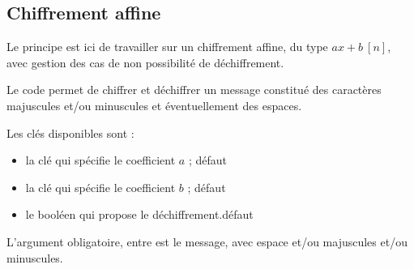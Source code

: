 \begin{PresCodePL}{}
\resinvmod
\end{PresCodePL}

\begin{PresCodePL}{}
\end{PresCodePL}

\subsection{Chiffrement affine}

\begin{tipblock}
Le principe est ici de travailler sur un chiffrement affine, du type $ax+b \: [n]$, avec gestion des cas de non possibilité de déchiffrement.

\smallskip

Le code permet de chiffrer et déchiffrer un message constitué des caractères majuscules et/ou minuscules et éventuellement des espaces.
\end{tipblock}

\begin{PresCodePL}{}
\end{PresCodePL}

\begin{cautionblock}
Les clés disponibles sont :

\begin{itemize}
	\item la clé  qui spécifie le coefficient $a$ ; \hfill{}défaut 
	\item la clé  qui spécifie le coefficient $b$ ; \hfill{}défaut 
	\item le booléen  qui propose le déchiffrement.\hfill{}défaut 
\end{itemize}

L'argument obligatoire, entre  est le message, avec espace et/ou majuscules et/ou minuscules.
\end{cautionblock}

\begin{PresCodePL}{}
\end{PresCodePL}

\begin{PresCodePL}{}
\end{PresCodePL}


